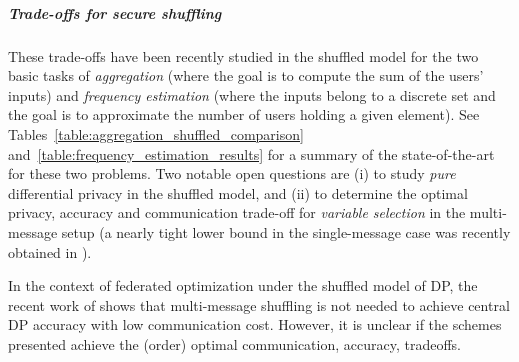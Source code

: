 \subparagraph{Trade-offs for secure shuffling} These trade-offs have been recently studied in the shuffled model for the two basic tasks of \emph{aggregation} (where the goal is to compute the sum of the users' inputs) and \emph{frequency estimation} (where the inputs belong to a discrete set and the goal is to approximate the number of users holding a given element). See Tables~\ref{table:aggregation_shuffled_comparison} and~\ref{table:frequency_estimation_results} for a summary of the state-of-the-art for these two problems. Two notable open questions are (i) to study \emph{pure} differential privacy in the shuffled model, and (ii) to determine the optimal privacy, accuracy and communication trade-off for \emph{variable selection} in the multi-message setup (a nearly tight lower bound in the single-message case was recently obtained in \cite{ghazi2019private}).

In the context of federated optimization under the shuffled model of DP, the recent work of \cite{girgis2020shuffled} shows that multi-message shuffling is not needed to achieve central DP accuracy with low communication cost. However, it is unclear if the schemes presented achieve the (order) optimal communication, accuracy, tradeoffs.  

